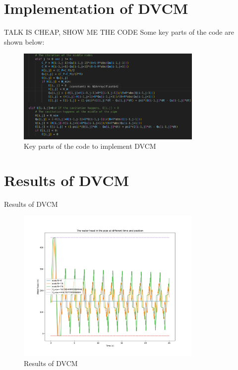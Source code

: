 \documentclass[UTF8]{ctexbeamer}
\begin{document}
\section{Implementation of DVCM}

\begin{frame}{TALK IS CHEAP, SHOW ME THE CODE}
    Some key parts of the code are shown below:
    \begin{figure}
        \centering
        \includegraphics[width=0.8\textwidth]{pic/keycode.png}
        \caption{Key parts of the code to implement DVCM}
    \end{figure}
\end{frame}

\section{Results of DVCM}

\begin{frame}{Results of DVCM}
    \begin{figure}
        \centering
        \includegraphics[width=0.8\textwidth]{pic/DVCM_Waterhead.png}
        \caption{Results of DVCM}
    \end{figure}
\end{frame}
\end{document}
